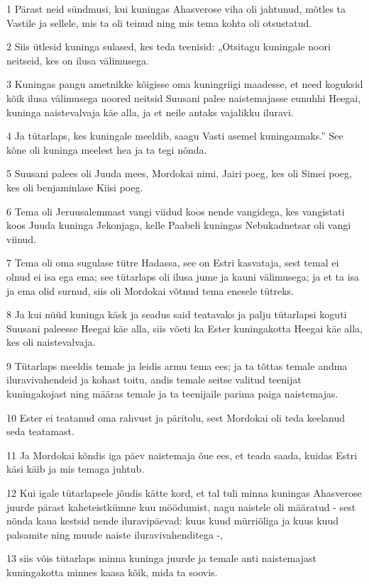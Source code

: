 \par 1 Pärast neid sündmusi, kui kuningas Ahasverose viha oli jahtunud, mõtles ta Vastile ja sellele, mis ta oli teinud ning mis tema kohta oli otsustatud.
\par 2 Siis ütlesid kuninga sulased, kes teda teenisid: „Otsitagu kuningale noori neitseid, kes on ilusa välimusega.
\par 3 Kuningas pangu ametnikke kõigisse oma kuningriigi maadesse, et need koguksid kõik ilusa välimusega noored neitsid Suusani palee naistemajasse eunuhhi Heegai, kuninga naistevalvaja käe alla, ja et neile antaks vajalikku iluravi.
\par 4 Ja tütarlaps, kes kuningale meeldib, saagu Vasti asemel kuningannaks.” See kõne oli kuninga meelest hea ja ta tegi nõnda.
\par 5 Suusani palees oli Juuda mees, Mordokai nimi, Jairi poeg, kes oli Simei poeg, kes oli benjaminlase Kiisi poeg.
\par 6 Tema oli Jeruusalemmast vangi viidud koos nende vangidega, kes vangistati koos Juuda kuninga Jekonjaga, kelle Paabeli kuningas Nebukadnetsar oli vangi viinud.
\par 7 Tema oli oma sugulase tütre Hadassa, see on Estri kasvataja, sest temal ei olnud ei isa ega ema; see tütarlaps oli ilusa jume ja kauni välimusega; ja et ta isa ja ema olid surnud, siis oli Mordokai võtnud tema enesele tütreks.
\par 8 Ja kui nüüd kuninga käsk ja seadus said teatavaks ja palju tütarlapsi koguti Suusani paleesse Heegai käe alla, siis võeti ka Ester kuningakotta Heegai käe alla, kes oli naistevalvaja.
\par 9 Tütarlaps meeldis temale ja leidis armu tema ees; ja ta tõttas temale andma iluravivahendeid ja kohast toitu, andis temale seitse valitud teenijat kuningakojast ning määras temale ja ta teenijaile parima paiga naistemajas.
\par 10 Ester ei teatanud oma rahvust ja päritolu, sest Mordokai oli teda keelanud seda teatamast.
\par 11 Ja Mordokai kõndis iga päev naistemaja õue ees, et teada saada, kuidas Estri käsi käib ja mis temaga juhtub.
\par 12 Kui igale tütarlapsele jõudis kätte kord, et tal tuli minna kuningas Ahasverose juurde pärast kaheteistkümne kuu möödumist, nagu naistele oli määratud - sest nõnda kaua kestsid nende iluravipäevad: kuus kuud mürriõliga ja kuus kuud palsamite ning muude naiste iluravivahenditega -,
\par 13 siis võis tütarlaps minna kuninga juurde ja temale anti naistemajast kuningakotta minnes kaasa kõik, mida ta soovis.
